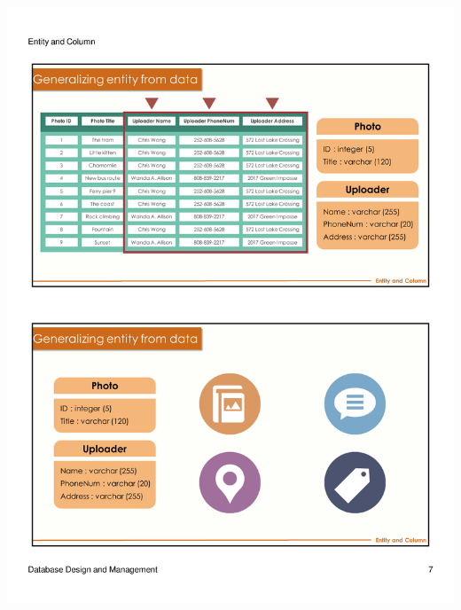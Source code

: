\begin{frame}{ }
    \centering
    \includegraphics[width=\textwidth, trim={10mm 24mm 10mm 134mm}, clip]{resources/02/02_7}
\end{frame}
